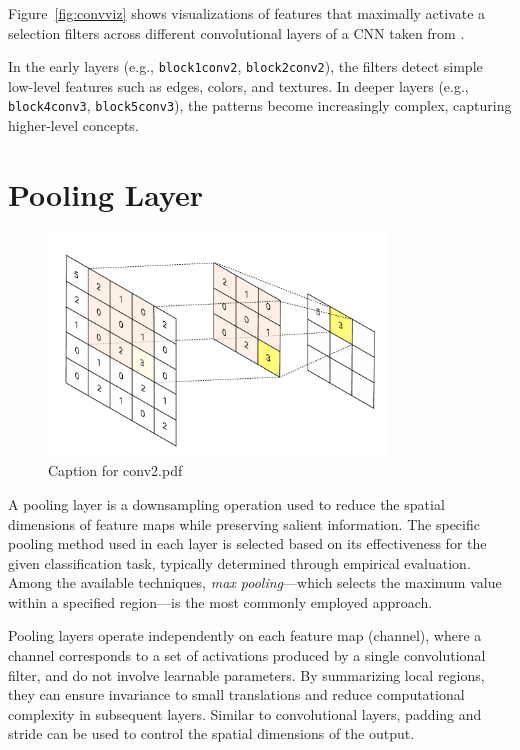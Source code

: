 \documentclass{pracalicmgr}
\begin{document}
Figure~\ref{fig:convviz} shows visualizations of features that maximally activate a selection filters across different convolutional layers of a CNN taken from \cite{activations}.

In the early layers (e.g., \texttt{block1conv2}, \texttt{block2conv2}), the filters detect simple low-level features such as edges, colors, and textures. In deeper layers (e.g., \texttt{block4conv3}, \texttt{block5conv3}), the patterns become increasingly complex, capturing higher-level concepts.

\section{Pooling Layer}

\begin{figure}[H]
    \centering
    \includegraphics[width=0.8\textwidth]{src/pool1.pdf}
    \caption{Caption for conv2.pdf}
\end{figure}

A pooling layer is a downsampling operation used to reduce the spatial dimensions of feature maps while preserving salient information. The specific pooling method used in each layer is selected based on its effectiveness for the given classification task, typically determined through empirical evaluation. Among the available techniques, \textit{max pooling}—which selects the maximum value within a specified region—is the most commonly employed approach.

Pooling layers operate independently on each feature map (channel), where a channel corresponds to a set of activations produced by a single convolutional filter, and do not involve learnable parameters. By summarizing local regions, they can ensure invariance to small translations and reduce computational complexity in subsequent layers. Similar to convolutional layers, padding and stride can be used to control the spatial dimensions of the output.
\end{document}
